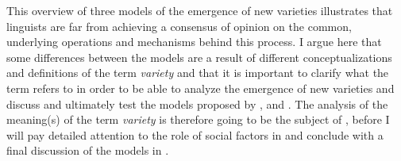 This overview of three models of the emergence of new varieties illustrates that linguists are far from achieving a consensus of opinion on the common, underlying operations and mechanisms behind this process. I argue here that some differences between the models are a result of different conceptualizations and definitions of the term \textit{variety} and that it is important to clarify what the term refers to in order to be able to analyze the emergence of new varieties and discuss and ultimately test the models proposed by \citet{Trudgill2004}, \citet{Schneider2007} and \citet{Kretzschmar2014, Kretzschmar2015}. The analysis of the meaning(s) of the term \textit{variety} is therefore going to be the subject of , before I will pay detailed attention to the role of social factors in  and conclude with a final discussion of the models in .

